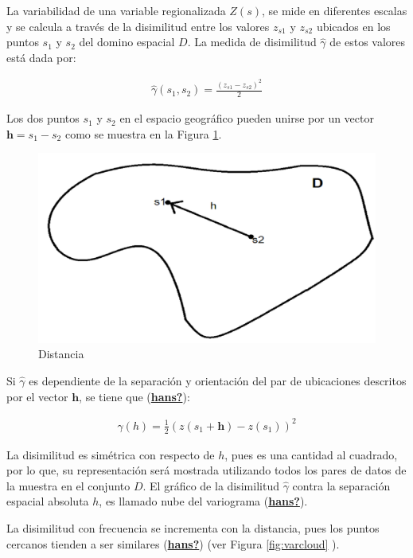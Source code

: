 \documentclass[
]{book}
\begin{document}
La variabilidad de una variable regionalizada \(Z(s)\), se mide en diferentes escalas y se calcula a través de la disimilitud entre los valores \(z_{s1}\) y \(z_{s2}\) ubicados en los puntos \(s_1\) y \(s_2\) del domino espacial \(D\). La medida de disimilitud \(\hat{\gamma}\) de estos valores está dada por:

\begin{align}
  \hat{\gamma}(s_1,s_2)=\frac{(z_{s1}-z_{s2})^2}{2}  
\end{align}

Los dos puntos \(s_1\) y \(s_2\) en el espacio geográfico pueden unirse por un vector \(\textbf{h}=s_1-s_2\) como se muestra en la Figura \ref{fig:distanciah}.

\begin{figure}
\includegraphics[width=17.78in]{figuras/otros/distancia_h} \caption{Distancia}\label{fig:distanciah}
\end{figure}

Si \(\hat{\gamma}\) es dependiente de la separación y orientación del par de ubicaciones descritos por el vector \(\textbf{h}\), se tiene que (\protect\hyperlink{ref-hans}{\textbf{hans?}}):

\begin{align}
  \hat{\gamma}(h)=\frac{1}{2}(z(s_1+\textbf{h})-z(s_1))^2  
\end{align}

La disimilitud es simétrica con respecto de \(h\), pues es una cantidad al cuadrado, por lo que, su representación será mostrada utilizando todos los pares de datos de la muestra en el conjunto \(D\). El gráfico de la disimilitud \(\hat{\gamma}\) contra la separación espacial absoluta \(h\), es llamado nube del variograma (\protect\hyperlink{ref-hans}{\textbf{hans?}}).

La disimilitud con frecuencia se incrementa con la distancia, pues los puntos cercanos tienden a ser similares (\protect\hyperlink{ref-hans}{\textbf{hans?}}) (ver Figura \ref{fig:varcloud} ).
\end{document}

